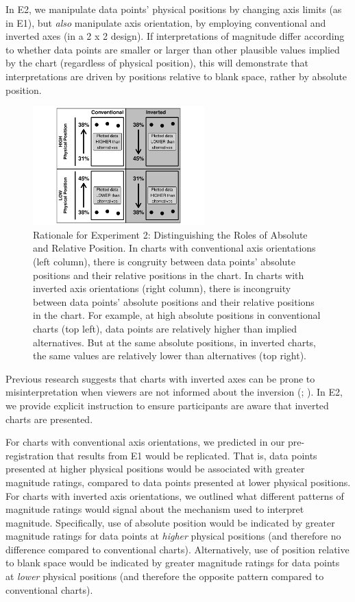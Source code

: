 \documentclass[journal]{vgtc}                %
\begin{document}
In E2, we manipulate data points' physical positions by changing axis
limits (as in E1), but \emph{also} manipulate axis orientation, by employing
conventional and inverted axes (in a 2 x 2 design). If interpretations
of magnitude differ according to whether data points are smaller or
larger than other plausible values implied by the chart (regardless of
physical position), this will demonstrate that interpretations are
driven by positions relative to blank space, rather by absolute
position.

\begin{figure}
\includegraphics[width=250px]{position_magnitude_files/figure-latex/r2-rationale-plot-1} \caption{Rationale for Experiment 2: Distinguishing the Roles of Absolute and Relative Position. 
 In charts with conventional axis orientations (left column), there is congruity between data points’ absolute positions and their relative positions in the chart. 
 In charts with inverted axis orientations (right column), there is incongruity between data points’ absolute positions and their relative positions in the chart. 
 For example, at high absolute positions in conventional charts (top left), data points are relatively higher than implied alternatives. But at the same absolute positions, in inverted charts, the same values are relatively lower than alternatives (top right).}\label{fig:r2-rationale-plot}
\end{figure}

Previous research suggests that charts with inverted axes can be prone
to misinterpretation when viewers are not informed about the inversion
(\citet{pandey_how_2015}; \citet{woodin_conceptual_2022}). In E2, we provide explicit
instruction to ensure participants are aware that inverted charts are
presented.

For charts with conventional axis orientations,
we predicted in our pre-registration that results from E1 would be replicated. That is, data
points presented at higher physical positions would be associated with
greater magnitude ratings, compared to data points presented at lower
physical positions. For charts with inverted axis orientations, we
outlined what different patterns of magnitude ratings would signal about
the mechanism used to interpret magnitude. Specifically, use of absolute
position would be indicated by greater magnitude ratings for data points
at \emph{higher} physical positions (and therefore no difference compared to
conventional charts). Alternatively, use of position relative to blank
space would be indicated by greater magnitude ratings for data points at
\emph{lower} physical positions (and therefore the opposite pattern compared
to conventional charts).
\end{document}

